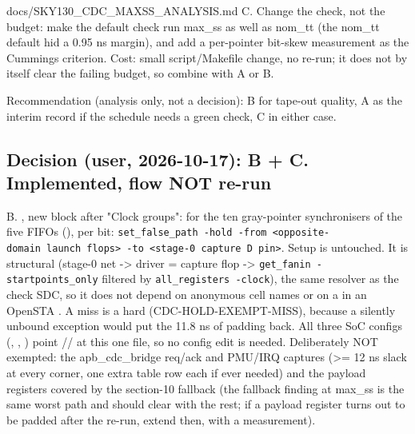 \begin{relocated}{docs/SKY130_CDC_MAXSS_ANALYSIS.md}
C. Change the check, not the budget: make the default check run max\_ss
as well as nom\_tt (the nom\_tt default hid a 0.95 ns margin), and add a
per-pointer bit-skew measurement as the Cummings criterion. Cost: small
script/\allowbreak{}Makefile change, no re-run; it does not by itself
clear the failing budget, so combine with A or B.

Recommendation (analysis only, not a decision): B for tape-out quality,
A as the interim record if the schedule needs a green check, C in either
case.

\subsection{Decision (user, 2026-10-17): B + C. Implemented, flow NOT
re-run}\label{tm:pd:sky130-cdc-maxss:5-decision-user-2026-10-17-b-c-implemented-flow-not-re-run}

B. , new block after
"Clock groups": for the ten gray-pointer synchronisers of the five
 FIFOs (), per bit:
\texttt{set\_\allowbreak{}false\_\allowbreak{}path\ -\allowbreak{}hold\ -\allowbreak{}from\ <opposite-\allowbreak{}domain\ launch\ flops>\ -\allowbreak{}to\ <stage-\allowbreak{}0\ capture\ D\ pin>}.
Setup is untouched. It is structural (stage-0  net
-\textgreater{} driver = capture flop -\textgreater{}
\texttt{get\_\allowbreak{}fanin\ -\allowbreak{}startpoints\_\allowbreak{}only}
filtered by \texttt{all\_\allowbreak{}registers\ -\allowbreak{}clock}),
the same resolver as the check SDC, so it does not depend on anonymous
cell names or on a  in an OpenSTA . A miss is a
hard  (CDC-HOLD-EXEMPT-MISS), because a silently unbound
exception would put the 11.8 ns of padding back. All three SoC configs
(, ,
) point
// at
this one file, so no config edit is needed. Deliberately NOT exempted:
the apb\_\allowbreak{}cdc\_\allowbreak{}bridge req/ack and PMU/IRQ
 captures (\textgreater= 12 ns slack at every corner, one
extra table row each if ever needed) and the payload registers covered
by the section-10 fallback (the fallback  finding at
max\_ss is the same worst path and should clear with the rest; if a
payload register turns out to be padded after the re-run, extend then,
with a measurement).


\end{relocated}
